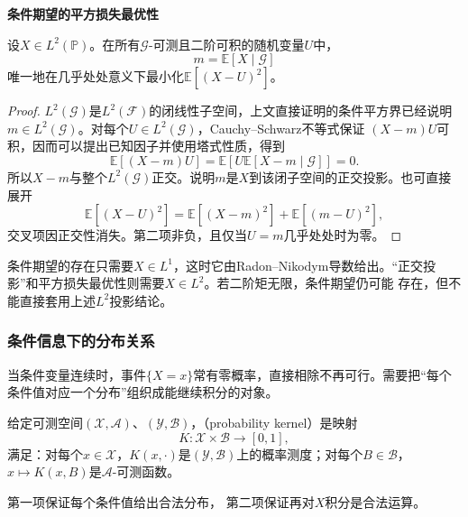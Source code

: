 \par\medskip\noindent\textbf{条件期望的平方损失最优性}\quad
\begin{theorem}[条件均值的平方损失最优性]
\label{thm:probability-conditional-mean-l2-projection}
设\(X\in L^2(\mathbb{P})\)。在所有\(\mathcal{G}\)-可测且二阶可积的随机变量\(U\)中，
\[ m=\mathbb{E}[X\mid\mathcal{G}] \]
唯一地在几乎处处意义下最小化\(\mathbb{E}[(X-U)^2]\)。
\end{theorem}

\begin{proof}
\(L^2(\mathcal{G})\)是\(L^2(\mathcal{F})\)的闭线性子空间，上文直接证明的条件平方界已经说明
\(m\in L^2(\mathcal{G})\)。对每个\(U\in L^2(\mathcal{G})\)，Cauchy--Schwarz不等式保证
\((X-m)U\)可积，因而可以提出已知因子并使用塔式性质，得到
\[ \mathbb{E}[(X-m)U]
  =\mathbb{E}\left[U\mathbb{E}[X-m\mid\mathcal{G}]\right]=0. \]
所以\(X-m\)与整个\(L^2(\mathcal{G})\)正交。说明\(m\)是\(X\)到该闭子空间的正交投影。也可直接展开
\begin{equation}
  \mathbb{E}[(X-U)^2]
  =
  \mathbb{E}[(X-m)^2]
  +
  \mathbb{E}[(m-U)^2],
  \label{eq:probability-pythagorean-prediction}
\end{equation}
交叉项因正交性消失。第二项非负，且仅当\(U=m\)几乎处处时为零。
\end{proof}

条件期望的存在只需要\(X\in L^1\)，这时它由Radon--Nikodym导数给出。“正交投影”和平方损失最优性则需要\(X\in L^2\)。若二阶矩无限，条件期望仍可能
存在，但不能直接套用上述\(L^2\)投影结论。


\subsubsection{条件信息下的分布关系}
\label{sec:rv-conditional-distribution}
当条件变量连续时，事件\(\{X=x\}\)常有零概率，直接相除不再可行。需要把“每个条件值对应一个分布”组织成能继续积分的对象。
\begin{definition}[概率核]
  \label{def:probability-kernel}
  给定可测空间\((\mathcal X,\mathcal A)\)、\((\mathcal Y,\mathcal B)\)，（probability kernel）是映射
  \[ K:\mathcal X\times\mathcal B\to[0,1], \]
  满足：对每个\(x\in\mathcal X\)，\(K(x,\cdot)\)是\((\mathcal Y,\mathcal B)\)上的概率测度；对每个\(B\in\mathcal B\)，\(x\mapsto K(x,B)\)是\(\mathcal A\)-可测函数。
\end{definition}
第一项保证每个条件值给出合法分布，
第二项保证再对\(X\)积分是合法运算。


